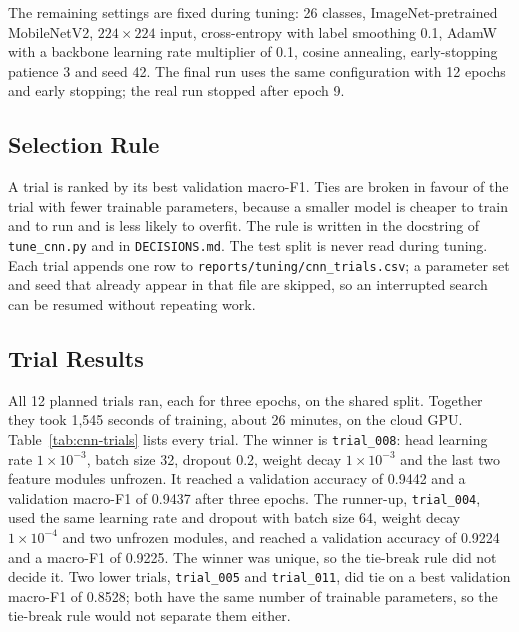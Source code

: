 The remaining settings are fixed during tuning: 26 classes, ImageNet-pretrained MobileNetV2, $224\times224$ input, cross-entropy with label smoothing 0.1, AdamW with a backbone learning rate multiplier of 0.1, cosine annealing, early-stopping patience 3 and seed 42. The final run uses the same configuration with 12 epochs and early stopping; the real run stopped after epoch 9.

\subsection{Selection Rule}

A trial is ranked by its best validation macro-F1. Ties are broken in favour of the trial with fewer trainable parameters, because a smaller model is cheaper to train and to run and is less likely to overfit. The rule is written in the docstring of \texttt{tune\_cnn.py} and in \texttt{DECISIONS.md}. The test split is never read during tuning. Each trial appends one row to \texttt{reports/tuning/cnn\_trials.csv}; a parameter set and seed that already appear in that file are skipped, so an interrupted search can be resumed without repeating work.

\subsection{Trial Results}


All 12 planned trials ran, each for three epochs, on the shared split. Together they took 1{,}545 seconds of training, about 26 minutes, on the cloud GPU. Table~\ref{tab:cnn-trials} lists every trial. The winner is \texttt{trial\_008}: head learning rate $1\times10^{-3}$, batch size 32, dropout 0.2, weight decay $1\times10^{-3}$ and the last two feature modules unfrozen. It reached a validation accuracy of 0.9442 and a validation macro-F1 of 0.9437 after three epochs. The runner-up, \texttt{trial\_004}, used the same learning rate and dropout with batch size 64, weight decay $1\times10^{-4}$ and two unfrozen modules, and reached a validation accuracy of 0.9224 and a macro-F1 of 0.9225. The winner was unique, so the tie-break rule did not decide it. Two lower trials, \texttt{trial\_005} and \texttt{trial\_011}, did tie on a best validation macro-F1 of 0.8528; both have the same number of trainable parameters, so the tie-break rule would not separate them either.

